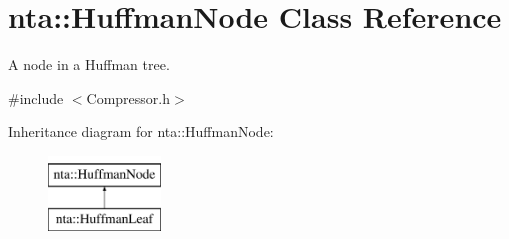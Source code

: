 \hypertarget{classnta_1_1HuffmanNode}{}\section{nta\+:\+:Huffman\+Node Class Reference}
\label{classnta_1_1HuffmanNode}


A node in a Huffman tree.  




{\ttfamily \#include $<$Compressor.\+h$>$}

Inheritance diagram for nta\+:\+:Huffman\+Node\+:\begin{figure}[H]
\begin{center}
\leavevmode
\includegraphics[height=2.000000cm]{classnta_1_1HuffmanNode}
\end{center}
\end{figure}
